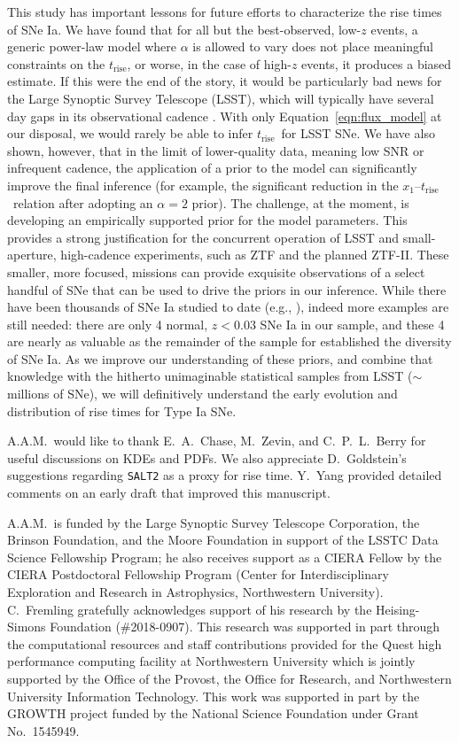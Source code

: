 \documentclass[twocolumn]{./aastex63}
\newcommand{\trise}{$t_\mathrm{rise}$}
\begin{document}
This study has important lessons for future efforts to characterize the rise
times of SNe Ia. We have found that for all but the best-observed, low-$z$
events, a generic power-law model where $\alpha$ is allowed to vary does not
place meaningful constraints on the \trise, or worse, in the case of high-$z$
events, it produces a biased estimate. If this were the end of the story, it
would be particularly bad news for the Large Synoptic Survey Telescope (LSST),
which will typically have several day gaps in its observational cadence
\citep{Ivezic08}. With only Equation~\ref{eqn:flux_model} at our disposal, we
would rarely be able to infer \trise\ for LSST SNe. We have also shown,
however, that in the limit of lower-quality data, meaning low SNR or
infrequent cadence, the application of a prior to the model can significantly
improve the final inference (for example, the significant reduction in the
$x_1$--\trise\ relation after adopting an $\alpha = 2$ prior). The challenge,
at the moment, is developing an empirically supported prior for the model
parameters. This provides a strong justification for the concurrent operation
of LSST and small-aperture, high-cadence experiments, such as ZTF and the
planned ZTF-II. These smaller, more focused, missions can provide exquisite
observations of a select handful of SNe that can be used to drive the priors
in our inference. While there have been thousands of SNe Ia studied to date
(e.g., \citealt{Jones17}), indeed more examples are still needed: there are
only 4 normal, $z < 0.03$ SNe Ia in our sample, and these 4 are nearly as
valuable as the remainder of the sample for established the diversity of SNe
Ia. As we improve our understanding of these priors, and combine that
knowledge with the hitherto unimaginable statistical samples from LSST
($\sim$millions of SNe), we will definitively understand the early evolution
and distribution of rise times for Type Ia SNe.

\acknowledgements

A.A.M.~would like to thank E.~A.~Chase, M.~Zevin, and C.~P.~L.~Berry for
useful discussions on KDEs and PDFs. We also appreciate D.~Goldstein's
suggestions regarding \texttt{SALT2} as a proxy for rise time. Y.~Yang
provided detailed comments on an early draft that improved this manuscript.

A.A.M.~is funded by the Large Synoptic Survey Telescope Corporation, the
Brinson Foundation, and the Moore Foundation in support of the LSSTC Data
Science Fellowship Program; he also receives support as a CIERA Fellow by the
CIERA Postdoctoral Fellowship Program (Center for Interdisciplinary
Exploration and Research in Astrophysics, Northwestern University).
C.~Fremling gratefully acknowledges support of his research by the
Heising-Simons Foundation (\#2018-0907). This research was supported in part
through the computational resources and staff contributions provided for the
Quest high performance computing facility at Northwestern University which is
jointly supported by the Office of the Provost, the Office for Research, and
Northwestern University Information Technology. This work was supported in
part by the GROWTH project funded by the National Science Foundation under
Grant No.~1545949.
\end{document}
